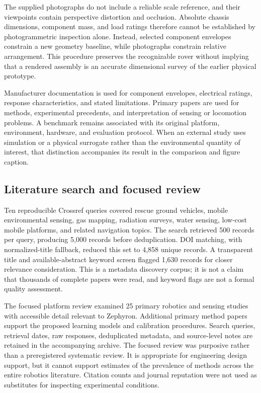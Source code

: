 \documentclass[11pt,letterpaper]{article}
\begin{document}
The supplied photographs do not include a reliable scale reference, and their viewpoints contain perspective distortion and occlusion. Absolute chassis dimensions, component mass, and load ratings therefore cannot be established by photogrammetric inspection alone. Instead, selected component envelopes constrain a new geometry baseline, while photographs constrain relative arrangement. This procedure preserves the recognizable rover without implying that a rendered assembly is an accurate dimensional survey of the earlier physical prototype.

Manufacturer documentation is used for component envelopes, electrical ratings, response characteristics, and stated limitations. Primary papers are used for methods, experimental precedents, and interpretation of sensing or locomotion problems. A benchmark remains associated with its original platform, environment, hardware, and evaluation protocol. When an external study uses simulation or a physical surrogate rather than the environmental quantity of interest, that distinction accompanies its result in the comparison and figure caption.

\subsection{Literature search and focused review}

Ten reproducible Crossref queries covered rescue ground vehicles, mobile environmental sensing, gas mapping, radiation surveys, water sensing, low-cost mobile platforms, and related navigation topics. The search retrieved 500 records per query, producing 5,000 records before deduplication. DOI matching, with normalized-title fallback, reduced this set to 4,858 unique records. A transparent title and available-abstract keyword screen flagged 1,630 records for closer relevance consideration. This is a metadata discovery corpus; it is not a claim that thousands of complete papers were read, and keyword flags are not a formal quality assessment.

The focused platform review examined 25 primary robotics and sensing studies with accessible detail relevant to Zephyron. Additional primary method papers support the proposed learning models and calibration procedures. Search queries, retrieval dates, raw responses, deduplicated metadata, and source-level notes are retained in the accompanying archive. The focused review was purposive rather than a preregistered systematic review. It is appropriate for engineering design support, but it cannot support estimates of the prevalence of methods across the entire robotics literature. Citation counts and journal reputation were not used as substitutes for inspecting experimental conditions.
\end{document}
